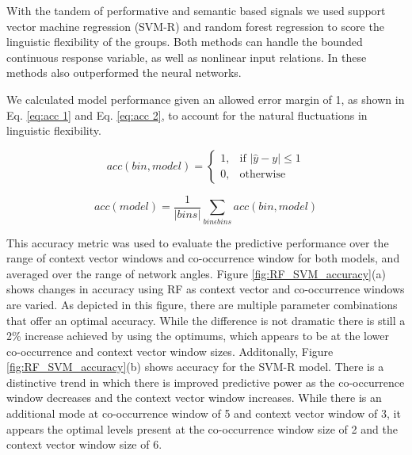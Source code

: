 \documentclass[11pt, a4paper]{article}
\begin{document}
With the tandem of performative and semantic based signals we used support vector machine regression (SVM-R) and random forest regression to score the linguistic flexibility of the groups. Both methods can handle the bounded continuous response variable, as well as nonlinear input relations. In  these methods also outperformed the neural networks.

We calculated model performance given an allowed error margin of 1, as shown in Eq. \ref{eq:acc 1} and Eq. \ref{eq:acc 2}, to account for the natural fluctuations in linguistic flexibility.

\begin{equation}
\label{eq:acc 1}
acc(bin, model) = 
\begin{cases} 
1, & \text{if } |\hat{y}-y| \leq 1 \\
0, & \text{otherwise}
\end{cases}
\end{equation}

\begin{equation}
\label{eq:acc 2}
acc(model) = \frac{1}{|bins|} \sum_{bin  \epsilon  bins} acc(bin, model)
\end{equation}

This accuracy metric was used to evaluate the predictive performance over the range of context vector windows and co-occurrence window for both models, and averaged over the range of network angles.  Figure \ref{fig:RF_SVM_accuracy}(a) shows changes in accuracy using RF as context vector and co-occurrence windows are varied. As depicted in this figure, there are multiple parameter combinations that offer an optimal accuracy. While the difference is not dramatic there is still a 2\% increase achieved by using the optimums, which appears to be at the lower co-occurrence and context vector window sizes. Additonally, Figure \ref{fig:RF_SVM_accuracy}(b) shows accuracy for the SVM-R model. There is a distinctive trend in which there is improved predictive power as the co-occurrence window decreases and the context vector window increases. While there is an additional mode at co-occurrence window of 5 and context vector window of 3, it appears the optimal levels present at the co-occurrence window size of 2 and the context vector window size of 6.
\end{document}

